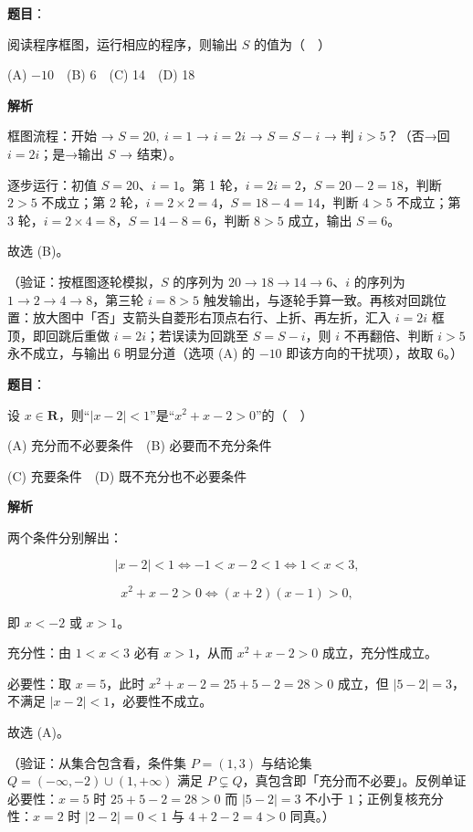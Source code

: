 \begin{answer}

\textbf{题目}：

阅读程序框图，运行相应的程序，则输出 \(S\) 的值为（　）
\nopagebreak[4]
\begin{center}\end{center}
\nopagebreak[4]
(A) \(-10\)　(B) 6　(C) 14　(D) 18

\textbf{解析}

框图流程：开始 → \(S=20,\ i=1\) → \(i=2i\) → \(S=S-i\) → 判 \(i>5\)？（否→回 \(i=2i\)；是→输出 \(S\) → 结束）。

逐步运行：初值 \(S=20\)、\(i=1\)。第 1 轮，\(i=2i=2\)，\(S=20-2=18\)，判断 \(2>5\) 不成立；第 2 轮，\(i=2\times2=4\)，\(S=18-4=14\)，判断 \(4>5\) 不成立；第 3 轮，\(i=2\times4=8\)，\(S=14-8=6\)，判断 \(8>5\) 成立，输出 \(S=6\)。

故选 (B)。

（验证：按框图逐轮模拟，\(S\) 的序列为 \(20\to18\to14\to6\)、\(i\) 的序列为 \(1\to2\to4\to8\)，第三轮 \(i=8>5\) 触发输出，与逐轮手算一致。再核对回跳位置：放大图中「否」支箭头自菱形右顶点右行、上折、再左折，汇入 \(i=2i\) 框顶，即回跳后重做 \(i=2i\)；若误读为回跳至 \(S=S-i\)，则 \(i\) 不再翻倍、判断 \(i>5\) 永不成立，与输出 \(6\) 明显分道（选项 (A) 的 \(-10\) 即该方向的干扰项），故取 \(6\)。）


\end{answer}
\begin{answer}

\textbf{题目}：

设 \(x\in\mathbf{R}\)，则“\(|x-2|<1\)”是“\(x^2+x-2>0\)”的（　）

(A) 充分而不必要条件　(B) 必要而不充分条件

(C) 充要条件　(D) 既不充分也不必要条件

\textbf{解析}

两个条件分别解出：

\nopagebreak[4]
\[
|x-2|<1\iff -1<x-2<1\iff 1<x<3,
\]

\nopagebreak[4]
\[
x^2+x-2>0\iff (x+2)(x-1)>0,
\]

即 \(x<-2\) 或 \(x>1\)。

充分性：由 \(1<x<3\) 必有 \(x>1\)，从而 \(x^2+x-2>0\) 成立，充分性成立。

必要性：取 \(x=5\)，此时 \(x^2+x-2=25+5-2=28>0\) 成立，但 \(|5-2|=3\)，不满足 \(|x-2|<1\)，必要性不成立。

故选 (A)。

（验证：从集合包含看，条件集 \(P=(1,3)\) 与结论集 \(Q=(-\infty,-2)\cup(1,+\infty)\) 满足 \(P\subsetneq Q\)，真包含即「充分而不必要」。反例单证必要性：\(x=5\) 时 \(25+5-2=28>0\) 而 \(|5-2|=3\) 不小于 \(1\)；正例复核充分性：\(x=2\) 时 \(|2-2|=0<1\) 与 \(4+2-2=4>0\) 同真。）


\end{answer}
